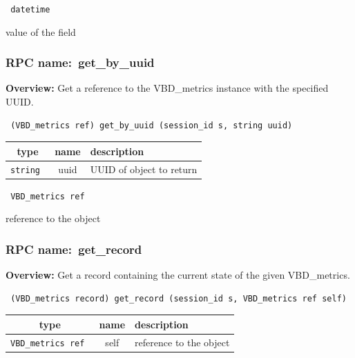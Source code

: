 \vspace{0.3cm}

{\tt 
datetime
}


value of the field
\vspace{0.3cm}
\vspace{0.3cm}
\vspace{0.3cm}
\subsubsection{RPC name:~get\_by\_uuid}

{\bf Overview:} 
Get a reference to the VBD\_metrics instance with the specified UUID.

\begin{verbatim} (VBD_metrics ref) get_by_uuid (session_id s, string uuid)\end{verbatim}



 
\vspace{0.3cm}
\begin{tabular}{|c|c|p{7cm}|}
 \hline
{\bf type} & {\bf name} & {\bf description} \\ \hline
{\tt string } & uuid & UUID of object to return \\ \hline 

\end{tabular}

\vspace{0.3cm}

{\tt 
VBD\_metrics ref
}


reference to the object
\vspace{0.3cm}
\vspace{0.3cm}
\vspace{0.3cm}
\subsubsection{RPC name:~get\_record}

{\bf Overview:} 
Get a record containing the current state of the given VBD\_metrics.

\begin{verbatim} (VBD_metrics record) get_record (session_id s, VBD_metrics ref self)\end{verbatim}



 
\vspace{0.3cm}
\begin{tabular}{|c|c|p{7cm}|}
 \hline
{\bf type} & {\bf name} & {\bf description} \\ \hline
{\tt VBD\_metrics ref } & self & reference to the object \\ \hline 

\end{tabular}

